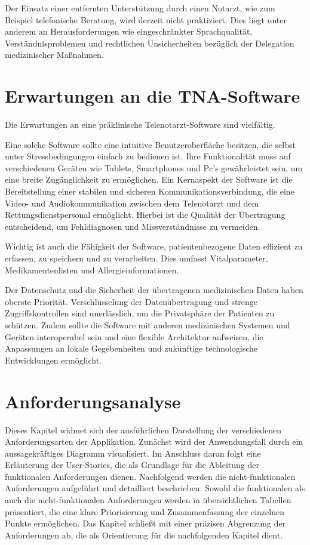 Der Einsatz einer entfernten Unterstützung durch einen Notarzt, wie 
zum Beispiel telefonische Beratung, wird derzeit nicht 
praktiziert. Dies liegt unter anderem an Herausforderungen 
wie eingeschränkter Sprachqualität, Verständnisproblemen 
und rechtlichen Unsicherheiten bezüglich der Delegation 
medizinischer Maßnahmen. 

\section{Erwartungen an die TNA-Software}

Die Erwartungen an eine präklinische Telenotarzt-Software sind vielfältig.

Eine solche Software sollte eine intuitive Benutzeroberfläche besitzen, die selbst unter Stressbedingungen einfach zu bedienen ist. Ihre Funktionalität muss auf verschiedenen Geräten wie Tablets, Smartphones und Pc's gewährleistet sein, um eine breite Zugänglichkeit zu ermöglichen. Ein Kernaspekt der Software ist die Bereitstellung einer stabilen und sicheren Kommunikationsverbindung, die eine Video- und Audiokommunikation zwischen dem Telenotarzt und dem Rettungsdienstpersonal ermöglicht. Hierbei ist die Qualität der Übertragung entscheidend, um Fehldiagnosen und Missverständnisse zu vermeiden.

Wichtig ist auch die Fähigkeit der Software, patientenbezogene Daten effizient zu erfassen, zu speichern und zu verarbeiten. Dies umfasst Vitalparameter, Medikamentenlisten und Allergieinformationen.

Der Datenschutz und die Sicherheit der übertragenen medizinischen Daten haben oberste Priorität. Verschlüsselung der Datenübertragung und strenge Zugriffskontrollen sind unerlässlich, um die Privatsphäre der Patienten zu schützen. Zudem sollte die Software mit anderen medizinischen Systemen und Geräten interoperabel sein und eine flexible Architektur aufweisen, die Anpassungen an lokale Gegebenheiten und zukünftige technologische Entwicklungen ermöglicht.


\section{Anforderungsanalyse}


Dieses Kapitel widmet sich der ausführlichen Darstellung der verschiedenen Anforderungsarten der Applikation. 
Zunächst wird der Anwendungsfall durch ein aussagekräftiges Diagramm visualisiert. Im Anschluss daran folgt eine Erläuterung der User-Stories, 
die als Grundlage für die Ableitung der funktionalen Anforderungen dienen. Nachfolgend werden die nicht-funktionalen Anforderungen aufgeführt und detailliert 
beschrieben. Sowohl die funktionalen als auch die nicht-funktionalen Anforderungen werden in übersichtlichen Tabellen präsentiert, die eine klare Priorisierung 
und Zusammenfassung der einzelnen Punkte ermöglichen. Das Kapitel schließt mit einer präzisen Abgrenzung der Anforderungen ab, die als Orientierung für die 
nachfolgenden Kapitel dient.


